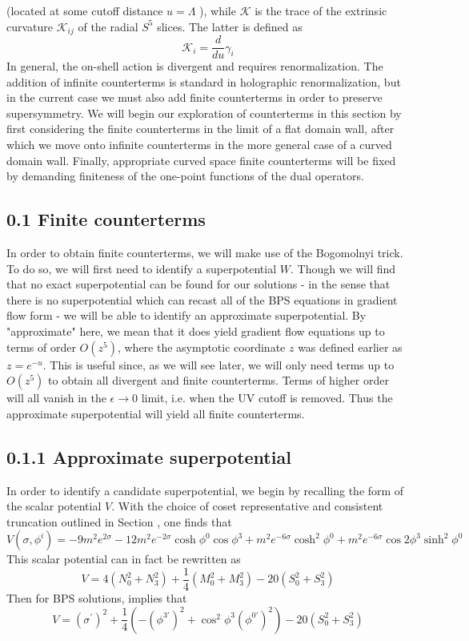 \documentclass{article}
\begin{document}
(located at some cutoff distance \(u=\Lambda\) ), while \(\mathcal{K}\) is the trace of the extrinsic curvature \(\mathcal{K}_{i j}\) of the radial \(S^{5}\) slices. The latter is defined as
\[
\mathcal{K}_{i}=\frac{d}{d u} \gamma_{i}
\]
In general, the on-shell action is divergent and requires renormalization. The addition of infinite counterterms is standard in holographic renormalization, but in the current case we must also add finite counterterms in order to preserve supersymmetry. We will begin our exploration of counterterms in this section by first considering the finite counterterms in the limit of a flat domain wall, after which we move onto infinite counterterms in the more general case of a curved domain wall. Finally, appropriate curved space finite counterterms will be fixed by demanding finiteness of the one-point functions of the dual operators.
\subsection*{0.1 Finite counterterms}
In order to obtain finite counterterms, we will make use of the Bogomolnyi trick. To do so, we will first need to identify a superpotential \(W\). Though we will find that no exact superpotential can be found for our solutions - in the sense that there is no superpotential which can recast all of the BPS equations in gradient flow form - we will be able to identify an approximate superpotential. By "approximate" here, we mean that it does yield gradient flow equations up to terms of order \(O\left(z^{5}\right)\), where the asymptotic coordinate \(z\) was defined earlier as \(z=e^{-u}\). This is useful since, as we will see later, we will only need terms up to \(O\left(z^{5}\right)\) to obtain all divergent and finite counterterms. Terms of higher order will all vanish in the \(\epsilon \rightarrow 0\) limit, i.e. when the UV cutoff is removed. Thus the approximate superpotential will yield all finite counterterms.
\subsection*{0.1.1 Approximate superpotential}
In order to identify a candidate superpotential, we begin by recalling the form of the scalar potential \(V\). With the choice of coset representative and consistent truncation outlined in Section , one finds that
\[
V\left(\sigma, \phi^{i}\right)=-9 m^{2} e^{2 \sigma}-12 m^{2} e^{-2 \sigma} \cosh \phi^{0} \cos \phi^{3}+m^{2} e^{-6 \sigma} \cosh ^{2} \phi^{0}+m^{2} e^{-6 \sigma} \cos 2 \phi^{3} \sinh ^{2} \phi^{0}
\]
This scalar potential can in fact be rewritten as
\[
V=4\left(N_{0}^{2}+N_{3}^{2}\right)+\frac{1}{4}\left(M_{0}^{2}+M_{3}^{2}\right)-20\left(S_{0}^{2}+S_{3}^{2}\right)
\]
Then for BPS solutions, implies that
\[
V=\left(\sigma^{\prime}\right)^{2}+\frac{1}{4}\left(-\left(\phi^{3 \prime}\right)^{2}+\cos ^{2} \phi^{3}\left(\phi^{0 \prime}\right)^{2}\right)-20\left(S_{0}^{2}+S_{3 }^{2}\right)
\]
\end{document}
